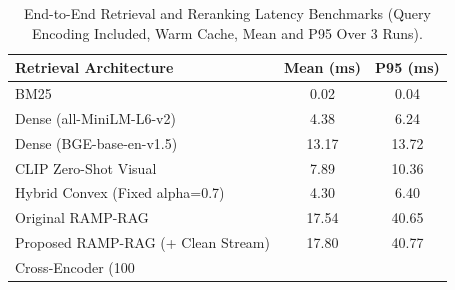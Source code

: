 \begin{table}[t]
\centering
\caption{End-to-End Retrieval and Reranking Latency Benchmarks (Query Encoding Included, Warm Cache, Mean and P95 Over 3 Runs).}
\label{tab:latencies}
\small
\begin{tabular}{l c c}
\hline
\textbf{Retrieval Architecture} & \textbf{Mean (ms)} & \textbf{P95 (ms)} \\
\hline
BM25 & 0.02 & 0.04 \\
Dense (all-MiniLM-L6-v2) & 4.38 & 6.24 \\
Dense (BGE-base-en-v1.5) & 13.17 & 13.72 \\
CLIP Zero-Shot Visual & 7.89 & 10.36 \\
Hybrid Convex (Fixed alpha=0.7) & 4.30 & 6.40 \\
Original RAMP-RAG & 17.54 & 40.65 \\
Proposed RAMP-RAG (+ Clean Stream) & 17.80 & 40.77 \\
Cross-Encoder (100%
\hline
\end{tabular}
\end{table}
